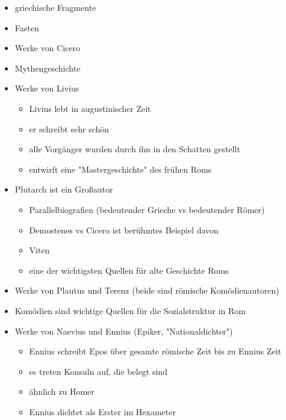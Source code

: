 \documentclass[10pt,a4paper,oneside,ngerman,numbers=noenddot]{scrartcl}
\newenvironment{myitemize}{\begin{itemize}\itemsep -9pt}{\end{itemize}} %
\begin{document}
\begin{myitemize}
    \item griechische Fragmente
    \item Fasten
    \item Werke von Cicero
    \item Mythengeschichte
    \item Werke von Livius
    \begin{myitemize}
        \item Livius lebt in augustinischer Zeit
        \item er schreibt sehr schön
        \item alle Vorgänger wurden durch ihn in den Schatten gestellt
        \item entwirft eine "Mastergeschichte" des frühen Roms
    \end{myitemize}
    \item Plutarch ist ein Großautor
    \begin{myitemize}
        \item Parallelbiografien (bedeutender Grieche vs bedeutender Römer)
        \item Demostenes vs Cicero ist berühmtes Beispiel davon
        \item Viten
        \item eine der wichtigsten Quellen für alte Geschichte Roms
    \end{myitemize}
    \item Werke von Plautus und Terenz (beide sind römische Komödienautoren)
    \item Komödien sind wichtige Quellen für die Sozialstruktur in Rom
    \item Werke von Naevius und Ennius (Epiker, "Nationaldichter")
    \begin{myitemize}
        \item Ennius schreibt Epos über gesamte römische Zeit bis zu Ennius Zeit
        \item es treten Konsuln auf, die belegt sind
        \item ähnlich zu Homer
        \item Ennius dichtet als Erster im Hexameter
    \end{myitemize}
\end{myitemize}
\end{document}
